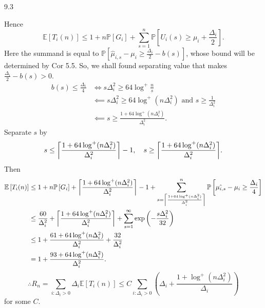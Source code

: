 \documentclass[10pt]{article}
\theoremstyle{definition}
\newenvironment{solution*}[1]{%
  \IfBlankTF{#1}
    {\renewcommand{\themanualsolutioninner}{\unskip}}
    {\renewcommand\themanualsolutioninner{#1}}%
  \manualsolutioninner
}{\endmanualsolutioninner}
\DeclarePairedDelimiter{\ceil}{\lceil}{\rceil}
\begin{document}
\begin{solution*}{9.3}
\begin{itemize}
        Hence 
        \begin{equation*}
            \mathbb{E}\left[ T_i (n) \right] \leq 1 + n \mathbb{P} \left[G_i \right] + \sum_{s=1}^n \mathbb{P} \left[ U_i (s) \geq \mu_i + \frac{\Delta_i}{2} \right].
        \end{equation*}
        Here the summand is equal to $\mathbb{P} \left[ \hat{\mu}_{i,s} - \mu_i \geq \frac{\Delta_i}{2} - b(s) \right]$, whose bound will be determined by Cor 5.5.
        So, we shall found separating value that makes $\frac{\Delta_i}{2} - b(s) > 0$.
        \begin{align*}
            b(s) \leq \frac{\Delta_i}{4} &\iff s \Delta_i^2 \geq 64 \log^+ \frac{n}{s} \\
            &\impliedby s \Delta_i^2 \geq 64 \log^+ (n \Delta_i^2) \text{ and } s \geq \frac{1}{\Delta_i^2} \\
            &\impliedby s \geq \frac{1 + 64 \log^+ (n\Delta_i^2)}{\Delta_i^2}.
        \end{align*}
        Separate $s$ by
        \begin{equation*}
            s \leq \ceil*{\frac{1 + 64 \log^+ (n\Delta_i^2)}{\Delta_i^2}} - 1, \quad s \geq \ceil*{\frac{1 + 64 \log^+ (n\Delta_i^2)}{\Delta_i^2}}.
        \end{equation*}
        Then
        \begin{align*}
            \mathbb{E}\left[T_i (n) \right] &\leq 1 + n \mathbb{P} \left[ G_i \right] + \ceil*{\frac{1 + 64\log^+ (n\Delta_i^2)}{\Delta_i^2}} - 1 + \sum_{s = \ceil*{\frac{1 + 64 \log^+ (n\Delta_i^2)}{\Delta_i^2}}}^n \mathbb{P} \left[ \hat{\mu_{i,s}} - \mu_i \geq \frac{\Delta_i}{4}\right] \\
            &\leq \frac{60}{\Delta_i^2} + \ceil*{\frac{1 + 64 \log^+ (n\Delta_i^2)}{\Delta_i^2}} + \sum_{s=1}^\infty \exp\left(-\frac{s \Delta_i^2}{32} \right) \\
            &\leq 1 + \frac{61 + 64 \log^+ (n\Delta_i^2)}{\Delta_i^2} + \frac{32}{\Delta_i^2} \\
            &= 1 + \frac{93 + 64 \log^+ (n\Delta_i^2)}{\Delta_i^2}.
        \end{align*}
        \begin{equation*}
            \therefore R_n = \sum_{i : \Delta_i > 0} \Delta_i \mathbb{E}[T_i (n)] \leq C \sum_{i: \Delta_i > 0} \left( \Delta_i + \frac{1 + \log^+ (n\Delta_i^2)}{\Delta_i} \right)
        \end{equation*}
        for some $C$.


\end{itemize}
\end{solution*}
\end{document}
